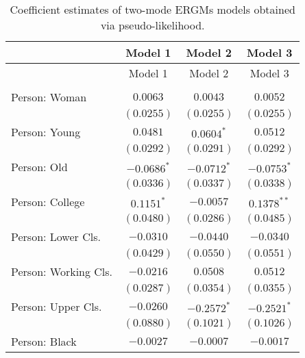 
\begin{center}
\begin{longtable}{l c c c}
\caption{Coefficient estimates of two-mode ERGMs models obtained via pseudo-likelihood.}
\label{tab:reg3}\\
\toprule
 & Model 1 & Model 2 & Model 3 \\
\midrule
\endfirsthead
\toprule
 & Model 1 & Model 2 & Model 3 \\
\midrule
\endhead
\bottomrule
\endfoot
\bottomrule
\multicolumn{4}{l}{\scriptsize{$^{***}p<0.001$; $^{**}p<0.01$; $^{*}p<0.05$}}\\
\endlastfoot
Person: Woman                       & $0.0063$        & $0.0043$       & $0.0052$        \\
                                    & $(0.0255)$      & $(0.0255)$     & $(0.0255)$      \\
Person: Young                       & $0.0481$        & $0.0604^{*}$   & $0.0512$        \\
                                    & $(0.0292)$      & $(0.0291)$     & $(0.0292)$      \\
Person: Old                         & $-0.0686^{*}$   & $-0.0712^{*}$  & $-0.0753^{*}$   \\
                                    & $(0.0336)$      & $(0.0337)$     & $(0.0338)$      \\
Person: College                     & $0.1151^{*}$    & $-0.0057$      & $0.1378^{**}$   \\
                                    & $(0.0480)$      & $(0.0286)$     & $(0.0485)$      \\
Person: Lower Cls.                  & $-0.0310$       & $-0.0440$      & $-0.0340$       \\
                                    & $(0.0429)$      & $(0.0550)$     & $(0.0551)$      \\
Person: Working Cls.                & $-0.0216$       & $0.0508$       & $0.0512$        \\
                                    & $(0.0287)$      & $(0.0354)$     & $(0.0355)$      \\
Person: Upper Cls.                  & $-0.0260$       & $-0.2572^{*}$  & $-0.2521^{*}$   \\
                                    & $(0.0880)$      & $(0.1021)$     & $(0.1026)$      \\
Person: Black                       & $-0.0027$       & $-0.0007$      & $-0.0017$       \\

\end{longtable}
\end{center}
